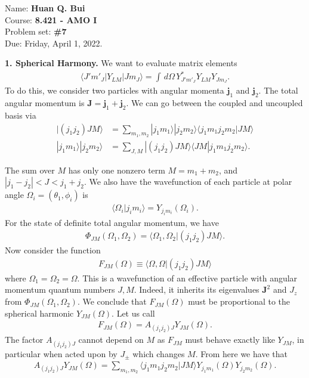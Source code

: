\documentclass{article}
\theoremstyle{definition}
\begin{document}
\begin{framed}
\noindent Name: \textbf{Huan Q. Bui}\\
Course: \textbf{8.421 - AMO I}\\
Problem set: \textbf{\#7}\\
Due: Friday, April 1, 2022.
\end{framed}
	
	
\noindent \textbf{1. Spherical Harmony.} We want to evaluate matrix elements
\begin{align*}
\langle J' m'_J| Y_{LM} |Jm_J\rangle = \int \,d\Omega \, Y^*_{J'm'_J} Y_{LM} Y_{Jm_J} .
\end{align*}
To do this, we consider two particles with angular momenta $\bm{j}_1$ and $\bm{j}_2$. The total angular momentum is $\bm{J} = \bm{j}_1 + \bm{j}_2$. We can go between the coupled and uncoupled basis via 
\begin{align*}
| (j_1j_2) JM\rangle &= \sum_{m_1,m_2} |j_1m_1\rangle | j_2m_2\rangle \langle j_1m_1j_2m_2 | JM\rangle\\
|j_1m_1\rangle | j_2m_2\rangle &= \sum_{J,M} |(j_1j_2)JM\rangle \langle JM| j_1m_1j_2m_2\rangle.
\end{align*}

The sum over $M$ has only one nonzero term $M=m_1+m_2$, and $|j_1-j_2| < J < j_1+j_2$. We also have the wavefunction of each particle at polar angle $\Omega_i = (\theta_1,\phi_i)$ is
\begin{align*}
\langle \Omega_i | j_i m_i \rangle = Y_{j_im_i}(\Omega_i).
\end{align*}
For the state of definite total angular momentum, we have
\begin{align*}
\Phi_{JM}(\Omega_1,\Omega_2) = \langle \Omega_1 ,\Omega_2| (j_1j_2)JM\rangle.
\end{align*}
Now consider the function 
\begin{align*}
F_{JM}(\Omega) \equiv \langle \Omega,\Omega| (j_1j_2)JM\rangle
\end{align*}
where $\Omega_1 = \Omega_2 = \Omega$. This is a wavefunction of an effective particle with angular momentum quantum numbers $J,M$. Indeed, it inherits its eigenvalues $\bm{J}^2$ and $J_z$ from $\Phi_{JM}(\Omega_1,\Omega_2)$. We conclude that $F_{JM}(\Omega)$ must be proportional to the spherical harmonic $Y_{JM}(\Omega)$. Let us call
\begin{align*}
F_{JM}(\Omega) = A_{(j_1j_2)J} Y_{JM}(\Omega). 
\end{align*}
The factor $A_{(j_1j_2)J}$ cannot depend on $M$ as $F_{JM}$ must behave exactly like $Y_{JM}$, in particular when acted upon by $J_{\pm}$ which changes $M$. From here we have that
\begin{align*}
A_{(j_1j_2)J} Y_{JM}(\Omega) = \sum_{m_1,m_2}  \langle j_1m_1j_2m_2 | JM\rangle Y_{j_1m_1}(\Omega) Y_{j_2m_2}(\Omega).
\end{align*}
\end{document}
